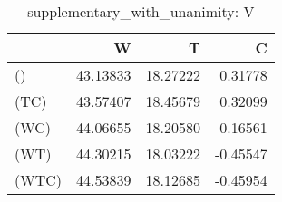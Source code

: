 \begin{table}
\centering
\caption{supplementary_with_unanimity: V}
\begin{tabular}{lrrr}
\toprule
{} &        W &        T &        C \\
\midrule
()    & 43.13833 & 18.27222 &  0.31778 \\
(TC)  & 43.57407 & 18.45679 &  0.32099 \\
(WC)  & 44.06655 & 18.20580 & -0.16561 \\
(WT)  & 44.30215 & 18.03222 & -0.45547 \\
(WTC) & 44.53839 & 18.12685 & -0.45954 \\
\bottomrule
\end{tabular}
\end{table}
